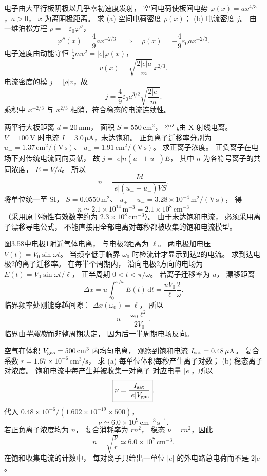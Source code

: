 电子由大平行板阴极以几乎零初速度发射，
空间电荷使板间电势
$\varphi(x)=ax^{4/3}$，$a>0$，
$x$ 为离阴极距离。
求 (a) 空间电荷密度 $\rho(x)$；
(b) 电流密度 $j$。
\exsolution
由一维泊松方程
$\rho=-\varepsilon_0\varphi''$，
\[
\varphi''(x)=\frac49ax^{-2/3}
\quad\Longrightarrow\quad
\boxed{\rho(x)=
-\frac49\varepsilon_0ax^{-2/3}}.
\]
电子速度由动能守恒
$\frac12mv^2=|e|\varphi(x)$，
\[
v(x)=\sqrt{\frac{2|e|a}{m}}\,x^{2/3}.
\]
电流密度的模
$j=|\rho|v$，故
\[
\boxed{j=\frac49\varepsilon_0a^{3/2}
\sqrt{\frac{2|e|}{m}}}.
\]
\excheck 乘积中 $x^{-2/3}$ 与 $x^{2/3}$
相消，符合稳态的电流连续性。

两平行大板距离 $d=20\,\mathrm{mm}$，
面积 $S=550\,\mathrm{cm^2}$，
空气由 X 射线电离。
$V=100\,\mathrm V$ 时电流
$I=3.0\,\mathrm{\mu A}$，未达饱和。
正负离子迁移率分别为
$u_+=1.37\,\mathrm{cm^2/(V\,s)}$、
$u_-=1.91\,\mathrm{cm^2/(V\,s)}$。
求正离子浓度。
\exsolution
正负离子在电场下对传统电流同向贡献，
故
$j=|e|n(u_++u_-)E$，
其中 $n$ 为各符号离子的共同浓度，
$E=V/d$。
所以
\[
\boxed{n=\frac{Id}{|e|(u_++u_-)VS}}.
\]
将单位统一至 SI，
$S=0.0550\,\mathrm{m^2}$、
$u_++u_-=3.28\times10^{-4}\,
\mathrm{m^2/(V\,s)}$，
得
\[
\boxed{n\simeq2.1\times10^{14}\,\mathrm{m^{-3}}
=2.1\times10^8\,\mathrm{cm^{-3}}}
\]
（采用原书物性有效数字约为
$2.3\times10^8\,\mathrm{cm^{-3}}$）。
\excheck 由于未达饱和电流，
必须采用离子漂移导电公式，
不能直接用全部电离对每秒都被收集的饱和电流模型。

图3.58中电极1附近气体电离，
与电极2距离为 $\ell$。
两电极加电压
$V(t)=V_0\sin\omega t$。
当频率低于临界
$\omega_0$ 时检流计才显示到达2的电流。
求到达电极2的离子迁移率。
\exsolution
在每半个周期内，
沿向电极2方向的电场为
$E(t)=V_0\sin\omega t/\ell$，
正半周期 $0<t<\pi/\omega$。
若离子迁移率为 $u$，
漂移距离
\[
\Delta x=u\int_0^{\pi/\omega}E(t)\,\mathrm dt
=\frac{uV_0}{\ell}
\frac2\omega.
\]
临界频率处刚能穿越间隙：
$\Delta x(\omega_0)=\ell$，
所以
\[
\boxed{u=\frac{\omega_0\ell^2}{2V_0}}.
\]
\excheck 临界由\emph{半周期}而非整周期决定，
因为后一半周期电场反向。

空气在体积
$V_{\rm gas}=500\,\mathrm{cm^3}$
内均匀电离，
观察到饱和电流
$I_{\rm sat}=0.48\,\mathrm{\mu A}$。
复合系数
$r=1.67\times10^{-6}\,\mathrm{cm^3/s}$，
求 (a) 每单位体积每秒产生离子对数；
(b) 稳态离子对浓度。
\exsolution
饱和电流中每产生并被收集一对离子
对应电量 $|e|$，所以
\[
\boxed{\nu=\frac{I_{\rm sat}}
{|e|V_{\rm gas}}}.
\]
代入
$0.48\times10^{-6}/
(1.602\times10^{-19}\times500)$，
\[
\boxed{\nu\simeq6.0\times10^9\,
\mathrm{cm^{-3}\,s^{-1}}}.
\]
若正负离子浓度均为 $n$，
复合消耗率为 $rn^2$，
稳态 $\nu=rn^2$，因此
\[
\boxed{n=\sqrt{\frac\nu r}
\simeq6.0\times10^7\,\mathrm{cm^{-3}}}.
\]
\excheck 在饱和收集电流的计数中，
每对离子只给出一单位 $|e|$
的外电路总电荷而不是 $2|e|$。

